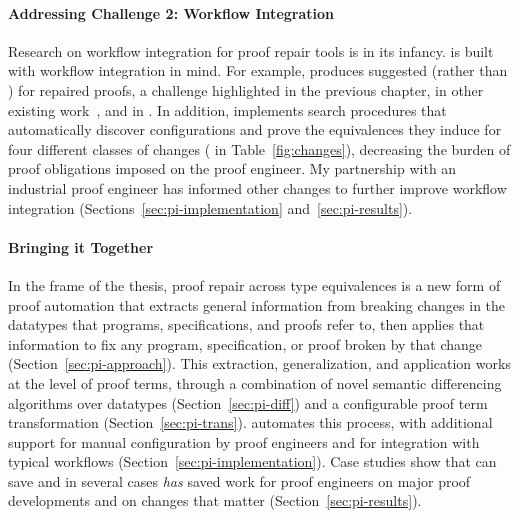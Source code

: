 \paragraph{Addressing Challenge 2: Workflow Integration}
Research on workflow integration for proof repair tools is in its infancy.
\toolnamec is built with workflow integration in mind.
For example, \toolnamec produces suggested  (rather than ) for repaired proofs,
a challenge highlighted in the previous chapter, in other existing work~\cite{robert2018}, and in .
In addition, \toolnamec implements search procedures that 
automatically discover configurations and prove the equivalences they induce for four different classes of 
changes ( in Table~\ref{fig:changes}),
decreasing the burden of proof obligations imposed on the proof engineer.
My partnership with an industrial proof engineer has informed other changes to further improve workflow integration
(Sections~\ref{sec:pi-implementation} and~\ref{sec:pi-results}).

\paragraph{Bringing it Together}
In the frame of the thesis, proof repair across type equivalences is a new form of proof automation that extracts general information from breaking 
changes in the datatypes that programs, specifications, and proofs refer to, 
then applies that information to fix any program, specification, or proof broken by that change (Section~\ref{sec:pi-approach}).
This extraction, generalization, and application works at the level of proof terms, through a combination of novel semantic differencing algorithms over datatypes (Section~\ref{sec:pi-diff}) and a configurable proof term transformation (Section~\ref{sec:pi-trans}).
\toolnamec automates this process,
with additional support for manual configuration by proof engineers and for integration with 
typical  workflows (Section~\ref{sec:pi-implementation}).
Case studies show that \toolnamec can save and in several cases \textit{has} saved work for proof engineers on major proof developments and on
changes that matter (Section~\ref{sec:pi-results}).















